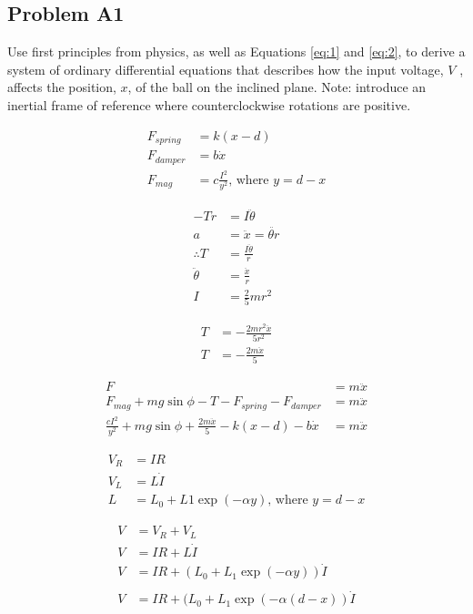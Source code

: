 \subsection*{Problem A1}\label{sec:q1} Use first principles from physics, as well as Equations \eqref{eq:1} and \eqref{eq:2}, to derive a system of ordinary differential equations that describes how the input voltage, \(V\) , affects the position, \(x\), of the ball on the inclined plane. Note: introduce an inertial frame of reference where counterclockwise rotations are positive.
    
    \begin{align}
        F_{spring} &= k(x - d)\\
        F_{damper} &= b\dot{x}\\
        F_{mag} &= c \frac{I^2}{y^2} \text{, where } y = d - x
    \end{align}

    \begin{align}
        -Tr &= I\ddot{\theta}\\
        a &= \ddot{x} = \ddot{\theta r}\\
        \therefore T &= \frac{I \ddot{\theta}}{r}\\
        \ddot{\theta} &= \frac{\ddot{x}}{r}\\
        I &= \frac{2}{5} mr^2
    \end{align}
    
    \begin{align}
        T &= - \frac{2mr^2 \ddot{x}}{5r^2} \nonumber \\
        T &= - \frac{2m \ddot{x}}{5}
    \end{align}
    
    \begin{align}
        F &= m \ddot{x} \nonumber \\
        F_{mag} + mg \sin{\phi} - T - F_{spring} - F_{damper} &= m \ddot{x} \nonumber \\
        \frac{cI^2}{y^2} + mg \sin{\phi} + \frac{2m \ddot{x}}{5} - k(x - d) - b \dot{x} &= m \ddot{x}
    \end{align}
    
    \begin{align}
        V_{R} &= IR\\
        V_{L} &= L \dot{I}\\
        L &= L_{0} + L{1} \exp(- \alpha y) \text{, where } y = d - x
    \end{align}
    
    \begin{align}
        V &= V_{R} + V_{L} \nonumber \\
        V &= IR + L \dot{I} \nonumber \\
        V &= IR + (L_{0} + L_{1} \exp(- \alpha y)) \dot{I} \nonumber \\
        \nonumber \\
        V &= IR + (L_{0} + L_{1} \exp(- \alpha (d - x))\dot{I}
    \end{align}
    
